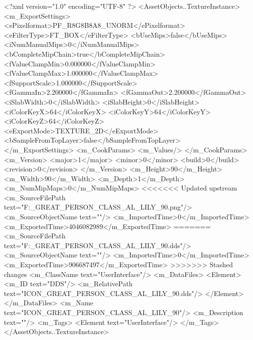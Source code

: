 <?xml version="1.0" encoding="UTF-8" ?>
<AssetObjects..TextureInstance>
	<m_ExportSettings>
		<ePixelformat>PF_R8G8B8A8_UNORM</ePixelformat>
		<eFilterType>FT_BOX</eFilterType>
		<bUseMips>false</bUseMips>
		<iNumManualMips>0</iNumManualMips>
		<bCompleteMipChain>true</bCompleteMipChain>
		<fValueClampMin>0.000000</fValueClampMin>
		<fValueClampMax>1.000000</fValueClampMax>
		<fSupportScale>1.000000</fSupportScale>
		<fGammaIn>2.200000</fGammaIn>
		<fGammaOut>2.200000</fGammaOut>
		<iSlabWidth>0</iSlabWidth>
		<iSlabHeight>0</iSlabHeight>
		<iColorKeyX>64</iColorKeyX>
		<iColorKeyY>64</iColorKeyY>
		<iColorKeyZ>64</iColorKeyZ>
		<eExportMode>TEXTURE_2D</eExportMode>
		<bSampleFromTopLayer>false</bSampleFromTopLayer>
	</m_ExportSettings>
	<m_CookParams>
		<m_Values/>
	</m_CookParams>
	<m_Version>
		<major>1</major>
		<minor>0</minor>
		<build>0</build>
		<revision>0</revision>
	</m_Version>
	<m_Height>90</m_Height>
	<m_Width>90</m_Width>
	<m_Depth>1</m_Depth>
	<m_NumMipMaps>0</m_NumMipMaps>
<<<<<<< Updated upstream
	<m_SourceFilePath text="F:\DT\lilyimages\gpportrait\ICON_GREAT_PERSON_CLASS_AL_LILY_90.png"/>
	<m_SourceObjectName text=""/>
	<m_ImportedTime>0</m_ImportedTime>
	<m_ExportedTime>4046082989</m_ExportedTime>
=======
	<m_SourceFilePath text="F:\DT\lilyimages\all\ICON_GREAT_PERSON_CLASS_AL_LILY_90.dds"/>
	<m_SourceObjectName text=""/>
	<m_ImportedTime>0</m_ImportedTime>
	<m_ExportedTime>906687497</m_ExportedTime>
>>>>>>> Stashed changes
	<m_ClassName text="UserInterface"/>
	<m_DataFiles>
		<Element>
			<m_ID text="DDS"/>
			<m_RelativePath text="ICON_GREAT_PERSON_CLASS_AL_LILY_90.dds"/>
		</Element>
	</m_DataFiles>
	<m_Name text="ICON_GREAT_PERSON_CLASS_AL_LILY_90"/>
	<m_Description text=""/>
	<m_Tags>
		<Element text="UserInterface"/>
	</m_Tags>
</AssetObjects..TextureInstance>

